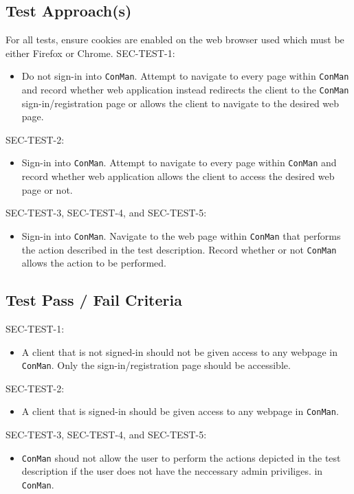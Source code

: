 \documentclass{article}
\begin{document}
\subsection{Test Approach(s)}
For all tests, ensure cookies are enabled on the web browser used which must be 
either Firefox or Chrome.\newline \newline
SEC-TEST-1:
\begin{itemize}
\item Do not sign-in into \texttt{ConMan}. Attempt to navigate to every page within 
\texttt{ConMan} and record whether web application instead redirects the client 
to the \texttt{ConMan} sign-in/registration page or allows the client to navigate 
to the desired web page.
\end{itemize}
SEC-TEST-2:
\begin{itemize}
\item Sign-in into \texttt{ConMan}. Attempt to navigate to every page within 
\texttt{ConMan} and record whether web application allows the client to access the 
desired web page or not.
\end{itemize}
SEC-TEST-3, SEC-TEST-4, and SEC-TEST-5:
\begin{itemize}
\item Sign-in into \texttt{ConMan}. Navigate to the web page within \texttt{ConMan} 
that performs the action described in the test description. Record whether or not 
\texttt{ConMan} allows the action to be performed.
\end{itemize}

\subsection{Test Pass / Fail Criteria}
SEC-TEST-1:
\begin{itemize}
\item A client that is not signed-in should not be given access to any webpage 
in \texttt{ConMan}. Only the sign-in/registration page should be accessible.
\end{itemize}

SEC-TEST-2:
\begin{itemize}
\item A client that is signed-in should be given access to any webpage 
in \texttt{ConMan}.
\end{itemize}

SEC-TEST-3, SEC-TEST-4, and SEC-TEST-5:
\begin{itemize}
\item \texttt{ConMan} shoud not allow the user to perform the actions depicted in 
the test description if the user does not have the neccessary admin priviliges. 
in \texttt{ConMan}.
\end{itemize}
\end{document}

